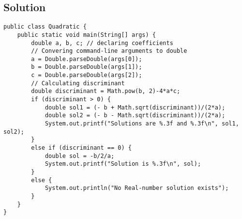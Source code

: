 \documentclass[12pt,letterpaper,twoside]{article}
\begin{document}
\subsection*{Solution}

\lstset{language=Java,tabsize=2}
\begin{lstlisting}
public class Quadratic {
	public static void main(String[] args) {
		double a, b, c; // declaring coefficients
		// Convering command-line arguments to double
		a = Double.parseDouble(args[0]);
		b = Double.parseDouble(args[1]);
		c = Double.parseDouble(args[2]);
		// Calculating discriminant
		double discriminant = Math.pow(b, 2)-4*a*c;
		if (discriminant > 0) {
			double sol1 = (- b + Math.sqrt(discriminant))/(2*a);
			double sol2 = (- b - Math.sqrt(discriminant))/(2*a);
			System.out.printf("Solutions are %.3f and %.3f\n", sol1, sol2);
		}
		else if (discriminant == 0) {
			double sol = -b/2/a;
			System.out.printf("Solution is %.3f\n", sol);
		}
		else {
			System.out.println("No Real-number solution exists");
		}
	}
}
\end{lstlisting}
\end{document}
